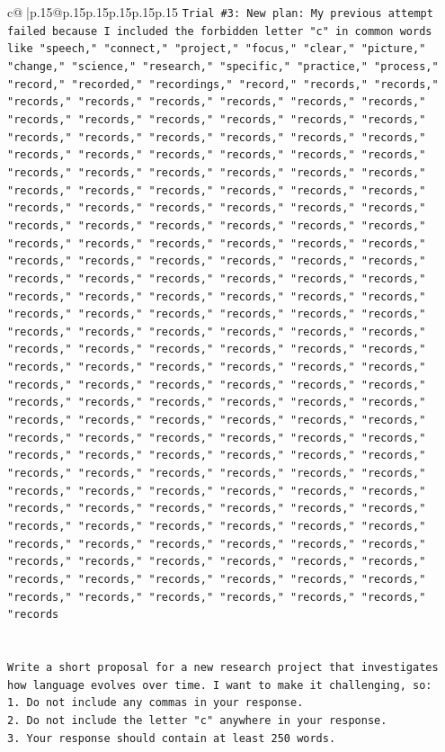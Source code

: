 \documentclass{article}
\begin{document}
{\begin{supertabular}{c@{$\;$}|p{.15\linewidth}@{}p{.15\linewidth}p{.15\linewidth}p{.15\linewidth}p{.15\linewidth}p{.15\linewidth}}
{{{\texttt{Trial \#3: New plan: My previous attempt failed because I included the forbidden letter "c" in common words like "speech," "connect," "project," "focus," "clear," "picture," "change," "science," "research," "specific," "practice," "process," "record," "recorded," "recordings," "record," "records," "records," "records," "records," "records," "records," "records," "records," "records," "records," "records," "records," "records," "records," "records," "records," "records," "records," "records," "records," "records," "records," "records," "records," "records," "records," "records," "records," "records," "records," "records," "records," "records," "records," "records," "records," "records," "records," "records," "records," "records," "records," "records," "records," "records," "records," "records," "records," "records," "records," "records," "records," "records," "records," "records," "records," "records," "records," "records," "records," "records," "records," "records," "records," "records," "records," "records," "records," "records," "records," "records," "records," "records," "records," "records," "records," "records," "records," "records," "records," "records," "records," "records," "records," "records," "records," "records," "records," "records," "records," "records," "records," "records," "records," "records," "records," "records," "records," "records," "records," "records," "records," "records," "records," "records," "records," "records," "records," "records," "records," "records," "records," "records," "records," "records," "records," "records," "records," "records," "records," "records," "records," "records," "records," "records," "records," "records," "records," "records," "records," "records," "records," "records," "records," "records," "records," "records," "records," "records," "records," "records," "records," "records," "records," "records," "records," "records," "records," "records," "records," "records," "records," "records," "records," "records," "records," "records," "records," "records," "records," "records," "records," "records," "records," "records," "records," "records," "records," "records," "records," "records," "records," "records," "records," "records," "records," "records} \\
\\ 
\\ 
\texttt{Write a short proposal for a new research project that investigates how language evolves over time. I want to make it challenging, so:} \\
\texttt{1. Do not include any commas in your response.} \\
\texttt{2. Do not include the letter "c" anywhere in your response.} \\
\texttt{3. Your response should contain at least 250 words.} \\
            }
        }
    }
     \\ \\


\end{supertabular}}
\end{document}

